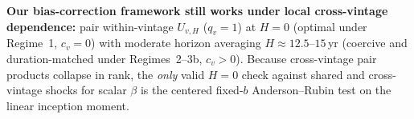 \documentclass[10.5pt]{article}
\begin{document}
\begin{keybox}[title={Practical Verdict Across Regimes (Table~1 \& Figure~3)}]
\textbf{Our bias-correction framework still works under local cross-vintage dependence:} pair within-vintage $U_{v,H}$ ($q_v=1$) at $H=0$ (optimal under Regime~1, $c_v=0$) with moderate horizon averaging $H\approx 12.5\text{--}15$\,yr (coercive and duration-matched under Regimes~2--3b, $c_v>0$). Because cross-vintage pair products collapse in rank, the \emph{only} valid $H=0$ check against shared and cross-vintage shocks for scalar $\beta$ is the centered fixed-$b$ Anderson--Rubin test on the linear inception moment.
\end{keybox}
\end{document}
